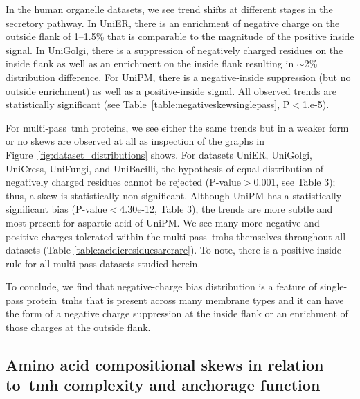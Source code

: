 In the human organelle datasets, we see trend shifts at different stages in the secretory pathway.
In UniER, there is an enrichment of negative charge on the outside flank of 1--1.5\% that is comparable to the magnitude of the positive inside signal.
In UniGolgi, there is a suppression of negatively charged residues on the inside flank as well as an enrichment on the inside flank resulting in \(\sim\)2\% distribution difference.
For UniPM, there is a negative-inside suppression (but no outside enrichment) as well as a positive-inside signal.
All observed trends are statistically significant (see Table~\ref{table:negativeskewsinglepass}, P$<$1.e-5).

For multi-pass~\gls{tmh} proteins, we see either the same trends but in a weaker form or no skews are observed at all as inspection of the graphs in Figure~\ref{fig:dataset_distributions} shows.
For datasets UniER, UniGolgi, UniCress, UniFungi, and UniBacilli, the hypothesis of equal distribution of negatively charged residues cannot be rejected (P-value$>$0.001, see Table 3); thus, a skew is statistically non-significant.
Although UniPM has a statistically significant bias (P-value$<$4.30e-12, Table 3), the trends are more subtle and most present for aspartic acid of UniPM\@.
We see many more negative and positive charges tolerated within the multi-pass~\gls{tmh}s themselves throughout all datasets (Table \ref{table:acidicresiduesarerare}).
To note, there is a positive-inside rule for all multi-pass datasets studied herein.

To conclude, we find that negative-charge bias distribution is a feature of single-pass protein~\gls{tmh}s that is present across many membrane types and it can have the form of a negative charge suppression at the inside flank or an enrichment of those charges at the outside flank.

\subsection{Amino acid compositional skews in relation to~\gls{tmh} complexity and anchorage function}

